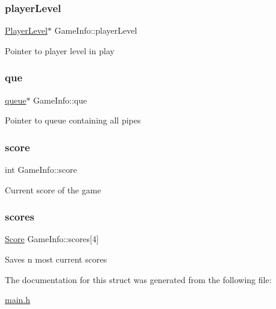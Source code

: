 \subsubsection{\texorpdfstring{player\+Level}{playerLevel}}
{\footnotesize\ttfamily \hyperlink{struct_player_level}{Player\+Level}$\ast$ Game\+Info\+::player\+Level}

Pointer to player level in play \mbox{\label{struct_game_info_ae921d4765b1a89b5fcf7ca5a5462bfbf}} 
\subsubsection{\texorpdfstring{que}{que}}
{\footnotesize\ttfamily \hyperlink{structqueue}{queue}$\ast$ Game\+Info\+::que}

Pointer to queue containing all pipes \mbox{\label{struct_game_info_ac46b9867fe4baf039bb1ebb132f1168f}} 
\subsubsection{\texorpdfstring{score}{score}}
{\footnotesize\ttfamily int Game\+Info\+::score}

Current score of the game \mbox{\label{struct_game_info_a5bd798bc489729fd6fd44ba615cefb7c}} 
\subsubsection{\texorpdfstring{scores}{scores}}
{\footnotesize\ttfamily \hyperlink{struct_score}{Score} Game\+Info\+::scores\mbox{[}4\mbox{]}}

Saves n most current scores 

The documentation for this struct was generated from the following file\+:\begin{DoxyCompactItemize}
\item 
\hyperlink{main_8h}{main.\+h}\end{DoxyCompactItemize}
